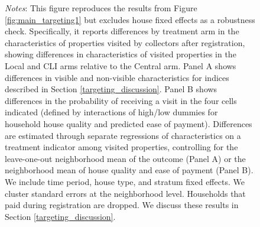 \documentclass[12pt,english]{article}
\renewcommand{\footnotesize}{\fontsize{9pt}{11pt}\selectfont}\usepackage[unicode=true,
\begin{document}
\begin{figure}[H]
\parbox{6in}{\footnotesize \textit{Notes}: This figure reproduces the results from Figure \ref{fig:main_targeting1} but excludes house fixed effects as a robustness check. Specifically, it reports differences by treatment arm in the characteristics of properties visited by collectors after registration, showing differences in characteristics of visited properties in the Local and CLI arms relative to the Central arm. Panel A shows differences in visible and non-visible characteristics for indices described in Section \ref{targeting_discussion}. Panel B shows differences in the probability of receiving a visit in the four cells indicated (defined by interactions of high/low dummies for household house quality and predicted ease of payment). Differences are estimated through separate regressions of characteristics on a treatment indicator among visited properties, controlling for the leave-one-out neighborhood mean of the outcome (Panel A) or the neighborhood mean of house quality and ease of payment (Panel B). We include time period, house type, and stratum fixed effects. We cluster standard errors at the neighborhood level. Households that paid during registration are dropped. We discuss these results in Section \ref{targeting_discussion}.}
\end{figure}

\end{document}
